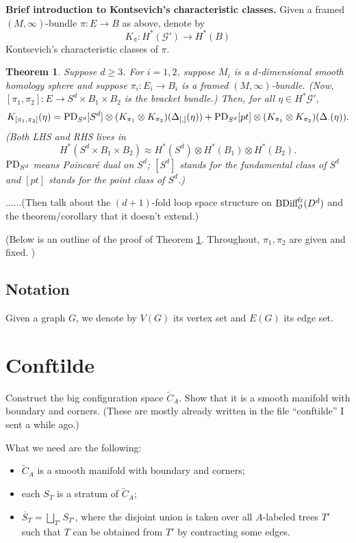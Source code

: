 \documentclass[11pt]{article}
\newtheorem{thm}{Theorem}[section]
\theoremstyle{definition}
\theoremstyle{remark}
\def\cG{\mathcal{G}}
\def\tn#1{\textnormal{#1}}
\begin{document}
{\bf Brief introduction to Kontsevich's characteristic classes.}
Given a framed $(M,\infty)$-bundle $\pi:E\to B$ as above, denote by  
$$K_\pi: H^*(\cG')\longrightarrow H^*(B)$$
Kontsevich's characteristic classes of $\pi$. 


\begin{thm}\label{formula_thm}
Suppose $d\ge3$. 
For $i=1,2$, suppose $M_i$ is a $d$-dimensional smooth homology sphere and 
suppose $\pi_i: E_i\to B_i$ is a framed $(M,\infty)$-bundle. 
(Now, $[\pi_1,\pi_2]: E\to S^d\times B_1\times B_2$ is the bracket bundle.)
Then, for all $\eta\in H^*\cG'$, 
\begin{align*}
K_{[\pi_1,\pi_2]}(\eta)=
\tn{PD}_{S^d}[S^d]\otimes
(K_{\pi_1}\otimes K_{\pi_2})(\Delta_{[,]}(\eta))
+\tn{PD}_{S^d}[pt]\otimes
(K_{\pi_1}\otimes K_{\pi_2})(\Delta_\cdot(\eta)).
\end{align*}
(Both LHS and RHS lives in 
$$H^*(S^d\times B_1\times B_2)\approx H^*(S^d)\otimes H^*(B_1)\otimes H^*(B_2).$$
$\tn{PD}_{S^d}$ means Poincar\'e dual on $S^d$; $[S^d]$ stands for the fundamental class of $S^d$ and $[pt]$ stands for the point class of $S^d$.)
\end{thm}


......(Then talk about the $(d+1)$-fold loop space structure on $\tn{BDiff}^{\tn{fr}}_\partial(D^d)$ and the theorem/corollary that it doesn't extend.)

(Below is an outline of the proof of Theorem \ref{formula_thm}.
Throughout, $\pi_1,\pi_2$ are given and fixed. 
)

\subsection{Notation}

Given a graph $G$, we denote by $V(G)$ its vertex set and $E(G)$ its edge set. 

\section{Conftilde}\label{conftilde_sec}

Construct the big configuration space $\widetilde{C}_A$. 
Show that it is a smooth manifold with boundary and corners. 
(These are mostly already written in the file ``conftilde'' I sent a while ago.)

What we need are the following: 

\begin{itemize}
\item $\widetilde{C}_A$ is a smooth manifold with boundary and corners; 
\item each $S_T$ is a stratum of $\widetilde{C}_A$; 
\item $\overline{S}_T=\bigsqcup_{T'}S_{T'}$, where the disjoint union is taken over all $A$-labeled trees $T'$ such that $T$ can be obtained from $T'$ by contracting some edges. 

\end{itemize}
\end{document}
